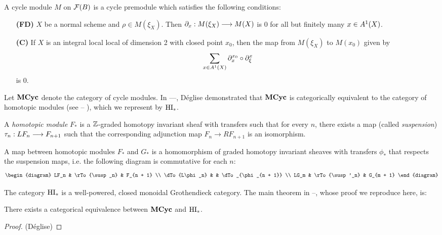 \begin{definition}
A cycle module $M$ on $\fields(B)$ is a cycle premodule which
satisfies the following conditions:

\begin{enumerate}
\item[\textbf{(FD)}]  
$X$ be a normal scheme and $\rho \in M(\xi_X)$. Then $\res{x}: 
M(\xi_X) \to M(X)$ is 0 for all but finitely many $x \in 
\subsch{1}{X}$.

\item[\textbf{(C)}]  If $X$ is an integral
local local of dimension 2 with closed point $x_0$, then the map 
from $M(\xi_X)$ to $M(x_0)$ given by
\[
\sum_{x \in \subsch{1}{X}} \ptres{x_0}{x} \comp \ptres{x}{\xi}
\]
is 0.
\end{enumerate}
\end{definition}

Let $\Cat{MCyc}$ denote the category of cycle modules. In ---,
D\'eglise demonstrated that $\Cat{MCyc}$ is categorically 
equivalent to the category of homotopic modules (see -- ), which
we represent by $\HI_*$. 

\begin{definition}
A \emph{homotopic module} $F_*$ is a $\Z$-graded homotopy 
invariant sheaf with transfers such that for every $n$, there
exists a map (called \emph{suspension}) $\susp_n: LF_n \to F_{n+1}$
such that the corresponding adjunction map $F_n \to RF_{n+1}$
is an isomorphism.

A map between homotopic modules $F_*$ and $G_*$ is a homomorphism 
of graded homotopy invariant sheaves with transfers $\phi_*$ that 
respects the suspension maps, i.e. the following diagram is 
commutative for each $n$:
\[
\begin{diagram}
LF_n          & \rTo{\susp_n}  & F_{n + 1}          \\
\dTo{L\phi_n} &                & \dTo_{\phi_{n + 1}} \\
LG_m          & \rTo{\susp'_n} & G_{m + 1}
\end{diagram}
\]
\end{definition}

The category $\HI_*$ is a well-powered, closed monoidal 
Grothendieck category. The main theorem in --, whose proof we 
reproduce here, is:

\begin{thm}\label{MCyc_HM_equiv}
There exists a categorical equivalence between $\Cat{MCyc}$
and $\HI_*$.
\end{thm}
\begin{proof}(D\'eglise)
\end{proof}

